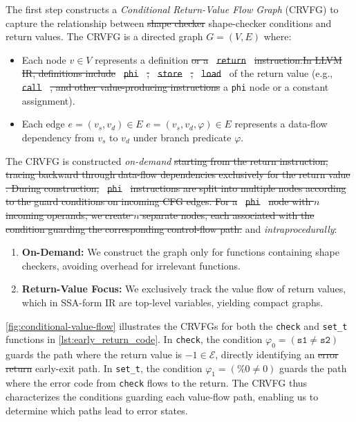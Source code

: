 \documentclass[manuscript,screen,review]{acmart}
\theoremstyle{indenteditalic}
\providecommand{\DIFaddtex}[1]{{\protect\color{blue}#1}} %
\providecommand{\DIFidentity}[1]{#1}
\providecommand{\DIFdeltex}[1]{{%
  \protect\color{red}%
  \normalfont\normalsize
  \let\textbf\DIFidentity
  \let\textit\DIFidentity
  \let\texttt\DIFidentity
  \let\textsc\DIFidentity
  \let\textsf\DIFidentity
  \let\emph\DIFidentity
  \let\uline\DIFidentity
  \sout{#1}%
}} %
\providecommand{\DIFaddbegin}{} %
\providecommand{\DIFaddend}{} %
\providecommand{\DIFdelbegin}{} %
\providecommand{\DIFdelend}{} %
\providecommand{\DIFadd}[1]{\texorpdfstring{\DIFaddtex{#1}}{#1}} %
\providecommand{\DIFdel}[1]{\texorpdfstring{\DIFdeltex{#1}}{}} %
\begin{document}
The first step constructs a \textit{Conditional Return-Value Flow Graph} (CRVFG) to capture the relationship between \DIFdelbegin \DIFdel{shape checker }\DIFdelend \DIFaddbegin \DIFadd{shape-checker }\DIFaddend conditions and return values.
The CRVFG is a directed graph $G = (V, E)$ where:
\begin{itemize}
	\item Each node $v \in V$ represents a definition \DIFdelbegin \DIFdel{or a }\texttt{\DIFdel{return}} %
\DIFdel{instruction.In LLVM IR, definitions include }\texttt{\DIFdel{phi}}%
\DIFdel{, }\texttt{\DIFdel{store}}%
\DIFdel{, }\texttt{\DIFdel{load}}%
\DIFdelend \DIFaddbegin \DIFadd{of the return value (e.g.}\DIFaddend , \DIFdelbegin \texttt{\DIFdel{call}}%
\DIFdel{, and other value-producing instructions}\DIFdelend \DIFaddbegin \DIFadd{a }\texttt{\DIFadd{phi}} \DIFadd{node or a constant assignment)}\DIFaddend .
	\item Each edge \DIFdelbegin \DIFdel{$e = (v_s, v_d) \in E$ }\DIFdelend \DIFaddbegin \DIFadd{$e = (v_s, v_d, \varphi) \in E$ }\DIFaddend represents a data-flow dependency from $v_s$ to $v_d$ \DIFaddbegin \DIFadd{under branch predicate $\varphi$}\DIFaddend .
\end{itemize}

The CRVFG is constructed \textit{on-demand} \DIFdel{starting from the return instruction, tracing backward through data-flow dependencies exclusively for the return value .
During construction, }\texttt{\DIFdel{phi}} %
\DIFdel{instructions are split into multiple nodes according to the guard conditions on incoming CFG edges.
For a }\texttt{\DIFdel{phi}} %
\DIFdel{node with $n$ incoming operands, we create $n$ separate nodes, each associated with the condition guarding the corresponding control-flow path.
}\DIFdelend \DIFaddbegin \DIFadd{and }\textit{\DIFadd{intraprocedurally}}\DIFadd{:
}\begin{enumerate}
	\item \textbf{\DIFadd{On-Demand:}} \DIFadd{We construct the graph only for functions containing shape checkers, avoiding overhead for irrelevant functions.
	}\item \textbf{\DIFadd{Return-Value Focus:}} \DIFadd{We exclusively track the value flow of return values, which in SSA-form IR are top-level variables, yielding compact graphs.
}\end{enumerate}
\DIFaddend 

\autoref{fig:conditional-value-flow} illustrates the CRVFGs for both the \texttt{check} and \texttt{set\_t} functions in \autoref{lst:early_return_code}.
In \texttt{check}, the condition $\varphi_0 = (\texttt{s1} \neq \texttt{s2})$ guards the path where the return value is $-1 \in \mathcal{E}$, directly identifying an \DIFdelbegin \DIFdel{error return }\DIFdelend \DIFaddbegin \DIFadd{early-exit }\DIFaddend path.
In \texttt{set\_t}, the condition $\varphi_1 = (\%0 \neq 0)$ guards the path where the error code from \texttt{check} flows to the return.
The CRVFG thus characterizes the conditions guarding each value-flow path, enabling us to determine which paths lead to error states.
\end{document}
